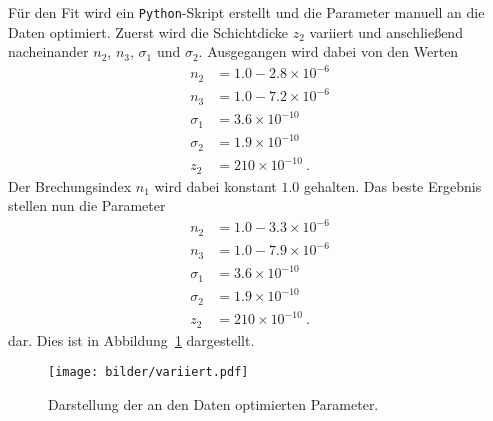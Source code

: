 Für den Fit wird ein \texttt{Python}-Skript erstellt und die Parameter manuell
an die Daten optimiert. Zuerst wird die Schichtdicke $z_2$ variiert und
anschließend nacheinander $n_2$, $n_3$, $\sigma_1$ und $\sigma_2$. Ausgegangen
wird dabei von den Werten
\begin{align*}
  n_2 &= 1.0 - 2.8 \times 10^{-6} \\
  n_3 &= 1.0 - 7.2 \times 10^{-6} \\
  \sigma_1 &= 3.6 \times 10^{-10} \\
  \sigma_2 &= 1.9 \times 10^{-10} \\
  z_2      &= 210 \times 10^{-10}~.
\end{align*}
Der Brechungsindex $n_1$ wird dabei konstant $1.0$ gehalten.
Das beste Ergebnis stellen nun die Parameter
\begin{align*}
  n_2 &= 1.0 - 3.3 \times 10^{-6} \\
  n_3 &= 1.0 - 7.9 \times 10^{-6} \\
  \sigma_1 &= 3.6 \times 10^{-10} \\
  \sigma_2 &= 1.9 \times 10^{-10} \\
  z_2      &= 210 \times 10^{-10}~.
\end{align*}
dar. Dies ist in Abbildung~\ref{fig:fit} dargestellt.

\begin{figure}[htpb]
  \centering
  \texttt{[image: bilder/variiert.pdf]}
  \caption{Darstellung der an den Daten optimierten Parameter.}
\label{fig:fit}
\end{figure}
